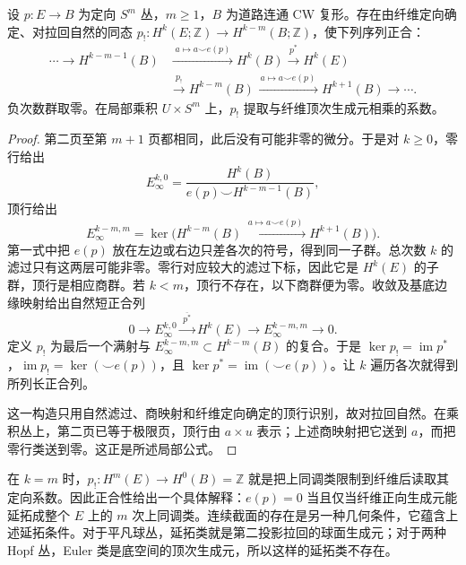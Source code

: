 \begin{theorem}\label{g2:thm:sphere-bundle-cohomology}
	设 \(p:E\to B\) 为定向 \(S^m\) 丛，\(m\ge1\)，\(B\) 为道路连通 CW 复形。存在由纤维定向确定、对拉回自然的同态 \(p_!:H^k(E;\mathbb Z)\to H^{k-m}(B;\mathbb Z)\)，使下列序列正合：
	\begin{equation}\label{g2:eq:sphere-bundle-exact-sequence}
		\begin{aligned}
			\cdots\longrightarrow H^{k-m-1}(B)&\xrightarrow{\;a\mapsto a\smile e(p)\;}H^k(B)\xrightarrow{p^*}H^k(E)\\
			&\xrightarrow{p_!}H^{k-m}(B)\xrightarrow{\;a\mapsto a\smile e(p)\;}H^{k+1}(B)\longrightarrow\cdots.
		\end{aligned}
	\end{equation}
	负次数群取零。在局部乘积 \(U\times S^m\) 上，\(p_!\) 提取与纤维顶次生成元相乘的系数。
\end{theorem}
\begin{proof}
	第二页至第 \(m+1\) 页都相同，此后没有可能非零的微分。于是对 \(k\ge0\)，零行给出
	\[
		E_\infty^{k,0}=\frac{H^k(B)}{e(p)\smile H^{k-m-1}(B)},
	\]
	顶行给出
	\[
		E_\infty^{k-m,m}=\ker\bigl(H^{k-m}(B)\xrightarrow{\;a\mapsto a\smile e(p)\;}H^{k+1}(B)\bigr).
	\]
	第一式中把 \(e(p)\) 放在左边或右边只差各次的符号，得到同一子群。总次数 \(k\) 的滤过只有这两层可能非零。零行对应较大的滤过下标，因此它是 \(H^k(E)\) 的子群，顶行是相应商群。若 \(k<m\)，顶行不存在，以下商群便为零。收敛及基底边缘映射给出自然短正合列
	\[
		0\longrightarrow E_\infty^{k,0}\xrightarrow{\;\overline{p^*}\;}H^k(E)\longrightarrow E_\infty^{k-m,m}\longrightarrow0.
	\]
	定义 \(p_!\) 为最后一个满射与 \(E_\infty^{k-m,m}\subset H^{k-m}(B)\) 的复合。于是 \(\ker p_!=\operatorname{im}p^*\)，\(\operatorname{im}p_!=\ker(\smile e(p))\)，且 \(\ker p^*=\operatorname{im}(\smile e(p))\)。让 \(k\) 遍历各次就得到所列长正合列。

	这一构造只用自然滤过、商映射和纤维定向确定的顶行识别，故对拉回自然。在乘积丛上，第二页已等于极限页，顶行由 \(a\times u\) 表示；上述商映射把它送到 \(a\)，而把零行类送到零。这正是所述局部公式。
\end{proof}

在 \(k=m\) 时，\(p_!:H^m(E)\to H^0(B)=\mathbb Z\) 就是把上同调类限制到纤维后读取其定向系数。因此正合性给出一个具体解释：\(e(p)=0\) 当且仅当纤维正向生成元能延拓成整个 \(E\) 上的 \(m\) 次上同调类。连续截面的存在是另一种几何条件，它蕴含上述延拓条件。对于平凡球丛，延拓类就是第二投影拉回的球面生成元；对于两种 Hopf 丛，Euler 类是底空间的顶次生成元，所以这样的延拓类不存在。


